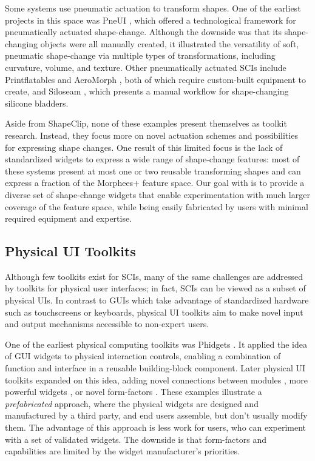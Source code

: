       Some systems use pneumatic actuation to transform shapes. One of the
      earliest projects in this space was PneUI \cite{Yao:2013bg}, which offered
      a technological framework for pneumatically actuated shape-change.
      Although the downside was that its shape-changing objects were all
      manually created, it illustrated the versatility of soft, pneumatic
      shape-change via multiple types of transformations, including curvature,
      volume, and texture. Other pneumatically actuated SCIs include
      Printflatables \cite{10.1145/3025453.3025898} and AeroMorph
      \cite{10.1145/2984511.2984520}, both of which require custom-built
      equipment to create, and Siloseam \cite{10.1145/3357236.3395473}, which
      presents a manual workflow for shape-changing silicone bladders.
      
      Aside from ShapeClip, none of these examples present themselves as toolkit
      research. Instead, they focus more on novel actuation schemes and
      possibilities for expressing shape changes. One result of this limited
      focus is the lack of standardized widgets to express a wide range of
      shape-change features: most of these systems present at most one or two
      reusable transforming shapes and can express a fraction of the Morphees+
      \cite{10.1145/3173574.3174193} feature space. Our goal with \mp is to
      provide a diverse set of shape-change widgets that enable experimentation
      with much larger coverage of the feature space, while being easily
      fabricated by users with minimal required equipment and expertise.
        
    \subsection{Physical UI Toolkits}
      Although few toolkits exist for SCIs, many of the same challenges are
      addressed by toolkits for physical user interfaces; in fact, SCIs can be
      viewed as a subset of physical UIs. In contrast to GUIs which take
      advantage of standardized hardware such as touchscreens or keyboards,
      physical UI toolkits aim to make novel input and output mechanisms
      accessible to non-expert users.
      
      One of the earliest physical computing toolkits was Phidgets
      \cite{Greenberg:2001}. It applied the idea of GUI widgets to physical
      interaction controls, enabling a combination of function and interface in
      a reusable building-block component. Later physical UI toolkits expanded
      on this idea, adding novel connections between modules
      \cite{Bdeir:2009kz}, more powerful widgets \cite{Villar:2012hd}, or novel
      form-factors \cite{Hodges:2014}. These examples illustrate a
      \textit{prefabricated} approach, where the physical widgets are designed
      and manufactured by a third party, and end users assemble, but don't
      usually modify them. The advantage of this approach is less work for
      users, who can experiment with a set of validated widgets. The downside is
      that form-factors and capabilities are limited by the widget
      manufacturer's priorities.
      
